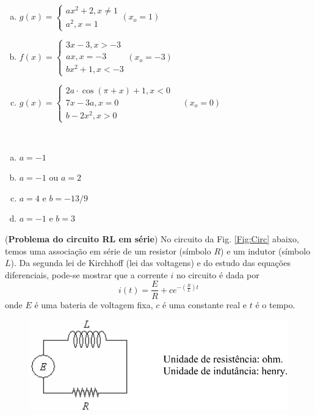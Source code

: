 \documentclass[a4paper, 12pt, addpoints]{exam}
\begin{document}
\begin{questions}
\begin{multicols}{2}
\begin{enumerate}[a)]
\item $g(x)=\left\{\begin{array}{l}a x^{2}+2, x \neq 1 \\ a^{2}, x=1\end{array}\left(x_{o}=1\right)\right.$
\item $f(x)=\left\{\begin{array}{l}3 x-3, x>-3 \\ a x, x=-3 \\ b x^{2}+1, x<-3\end{array}\left(x_{o}=-3\right)\right.$
\item $g(x)=\left\{\begin{array}{l}2 a \cdot \cos (\pi+x)+1, x<0 \\ 7 x-3 a, x=0 \\ b-2 x^{2}, x>0\end{array} \quad\left(x_{o}=0\right)\right.$
\end{enumerate}
\end{multicols}
\begin{resp}~
\begin{multicols}{2}
\begin{enumerate}[a)]
\item $a=-1$
\item $a=-1$ ou $a=2$
\item $a=4$ e $b=-13/9$
\item $a=-1$ e $b=3$
\end{enumerate}
\end{multicols}
\end{resp}
\question (\textbf{Problema do circuito RL em série})
No circuito da Fig. \ref{Fig:Circ} abaixo, temos uma associação em série de um resistor (símbolo $R$) e um indutor (símbolo $L$). Da segunda lei de Kirchhoff (lei das voltagens) e do estudo das equações diferenciais, pode-se mostrar que a corrente $i$ no circuito é dada por
\begin{equation}
  i(t)=\dfrac{E}{R}+ce^{-\left(\frac{R}{L}\right)t}\label{eq.resistor}
\end{equation}
onde $E$ é uma bateria de voltagem fixa, $c$ é uma constante real e $t$ é o tempo.
\begin{figure}[hbt]
\includegraphics[scale=0.65]{Figs/L1/Resistor.png}\label{fig-resistorL1}

\end{figure}
\end{questions}
\end{document}
